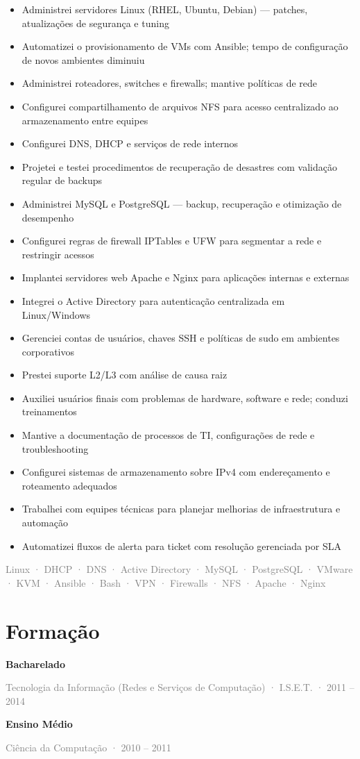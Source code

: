 \documentclass[10pt,a4paper]{article}
\newcommand{\tagline}[1]{\textcolor{graytext}{\small #1}\par}
\begin{document}
\begin{itemize}
  \item Administrei servidores Linux (RHEL, Ubuntu, Debian) — patches, atualizações de segurança e tuning
  \item Automatizei o provisionamento de VMs com Ansible; tempo de configuração de novos ambientes diminuiu
  \item Administrei roteadores, switches e firewalls; mantive políticas de rede
  \item Configurei compartilhamento de arquivos NFS para acesso centralizado ao armazenamento entre equipes
  \item Configurei DNS, DHCP e serviços de rede internos
  \item Projetei e testei procedimentos de recuperação de desastres com validação regular de backups
  \item Administrei MySQL e PostgreSQL — backup, recuperação e otimização de desempenho
  \item Configurei regras de firewall IPTables e UFW para segmentar a rede e restringir acessos
  \item Implantei servidores web Apache e Nginx para aplicações internas e externas
  \item Integrei o Active Directory para autenticação centralizada em Linux/Windows
  \item Gerenciei contas de usuários, chaves SSH e políticas de sudo em ambientes corporativos
  \item Prestei suporte L2/L3 com análise de causa raiz
  \item Auxiliei usuários finais com problemas de hardware, software e rede; conduzi treinamentos
  \item Mantive a documentação de processos de TI, configurações de rede e troubleshooting
  \item Configurei sistemas de armazenamento sobre IPv4 com endereçamento e roteamento adequados
  \item Trabalhei com equipes técnicas para planejar melhorias de infraestrutura e automação
  \item Automatizei fluxos de alerta para ticket com resolução gerenciada por SLA
\end{itemize}
\tagline{Linux · DHCP · DNS · Active Directory · MySQL · PostgreSQL · VMware · KVM · Ansible · Bash · VPN · Firewalls · NFS · Apache · Nginx}
\vspace{1pt}
\section*{Formação}
\textbf{Bacharelado}\par
\tagline{Tecnologia da Informação (Redes e Serviços de Computação) · I.S.E.T. · 2011 – 2014}
\textbf{Ensino Médio}\par
\tagline{Ciência da Computação · 2010 – 2011}
\end{document}
